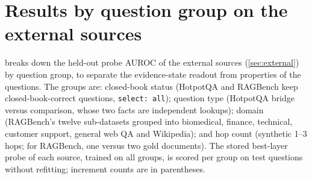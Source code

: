 \section{Results by question group on the external sources}
\label{app:groups}
 breaks down the held-out probe AUROC of the external sources (\cref{sec:external}) by question group, to separate the evidence-state readout from properties of the questions. The groups are: closed-book status (HotpotQA and RAGBench keep closed-book-correct questions, \texttt{select: all}); question type (HotpotQA bridge versus comparison, whose two facts are independent lookups); domain (RAGBench's twelve sub-datasets grouped into biomedical, finance, technical, customer support, general web QA and Wikipedia); and hop count (synthetic 1--3 hops; for RAGBench, one versus two gold documents). The stored best-layer probe of each source, trained on all groups, is scored per group on test questions without refitting; increment counts are in parentheses.
\begin{table}[h]
\centering\scriptsize

\caption{Held-out probe AUROC by question group (test-set increment counts in parentheses): closed-book status, question type, domain and hop count.}
\label{tab:groups}
\end{table}
